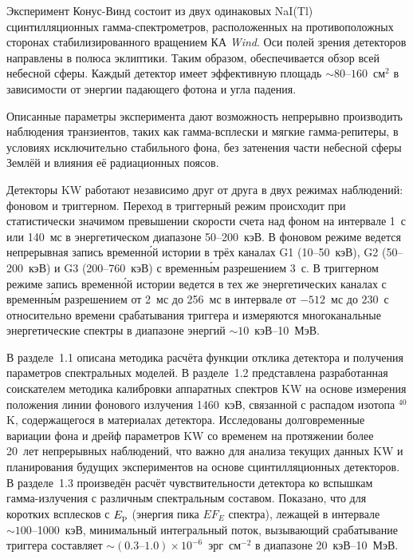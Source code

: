 Эксперимент Конус-Винд состоит из двух одинаковых NaI(Tl) сцинтилляционных 
гамма-спектрометров, расположенных на противоположных сторонах стабилизированного 
вращением КА \textit{Wind}. Оси полей зрения детекторов 
направлены в полюса эклиптики. Таким образом, обеспечивается обзор всей небесной сферы. 
Каждый детектор имеет эффективную площадь $\sim 80\textrm{--}160$~см$^2$ в 
зависимости от энергии падающего фотона и угла падения.  

Описанные параметры эксперимента дают 
возможность непрерывно производить наблюдения транзиентов, таких как гамма-всплески 
и мягкие гамма-репитеры, в условиях исключительно стабильного фона, 
без затенения части небесной сферы Землёй и влияния её радиационных поясов. 

Детекторы KW работают независимо друг от друга в двух режимах наблюдений: 
фоновом и триггерном. Переход в триггерный режим происходит при статистически 
значимом превышении скорости счета над фоном на интервале 1~с или 140~мс 
в энергетическом диапазоне 50--200~кэВ. В фоновом режиме ведется 
непрерывная запись временн\'{о}й истории в трёх каналах G1 (10--50~кэВ), G2 (50--200~кэВ) 
и G3 (200--760~кэВ) с временн\'{ы}м разрешением $3$~с. В триггерном режиме запись 
временн\'{о}й истории ведется в тех же энергетических каналах с временн\'{ы}м разрешением 
от 2~мс до 256~мс в интервале от $-512$~мс до $230$~с относительно времени срабатывания 
триггера и измеряются многоканальные энергетические спектры в диапазоне энергий $\sim 10$~кэВ--10~МэВ.

В разделе~1.1 описана методика расчёта функции отклика детектора и 
получения параметров спектральных моделей. В разделе~1.2 представлена 
разработанная соискателем методика калибровки аппаратных спектров KW на основе измерения 
положения линии фонового излучения 1460~кэВ, связанной с распадом изотопа $^{40}$K, 
содержащегося в материалах детектора. 
Исследованы долговременные вариации фона и дрейф параметров KW со временем на протяжении 
более 20~лет непрерывных наблюдений, что важно для анализа текущих данных KW и 
планирования будущих экспериментов на основе сцинтилляционных детекторов.
В разделе~1.3 произведён расчёт чувствительности детектора 
ко вспышкам гамма-излучения с различным спектральным составом.
Показано, что для коротких всплесков с $E_{\mathrm{p}}$ (энергия пика $E F_{E}$ спектра), лежащей в интервале
$\sim 100$--1000~кэВ, минимальный интегральный поток, вызывающий срабатывание триггера
составляет $\sim (0.3\textrm{--}1.0) \times 10^{-6}$~эрг~см$^{-2}$ в диапазоне 20~кэВ--10~МэВ.

